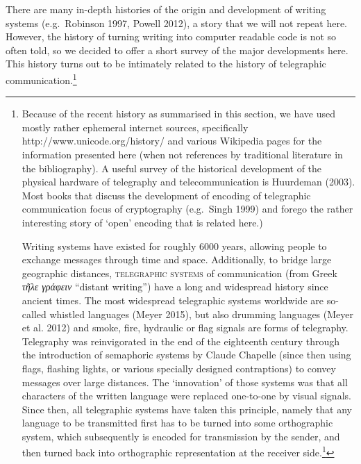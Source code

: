 There are many in-depth histories of the origin and development of writing systems (e.g.~Robinson 1997, Powell 2012), a story that we will not repeat here. However, the history of turning writing into computer readable code is not so often told, so we decided to offer a short survey of the major developments here. This history turns out to be intimately related to the history of telegraphic communication.\footnote{Because of the recent history as summarised in this section, we have used mostly rather ephemeral internet sources, specifically http://www.unicode.org/history/ and various Wikipedia pages for the information presented here (when not references by traditional literature in the bibliography). A useful survey of the historical development of the physical hardware of telegraphy and telecommunication is Huurdeman (2003). Most books that discuss the development of encoding of telegraphic communication focus of cryptography (e.g.~Singh 1999) and forego the rather interesting story of `open' encoding that is related here.)

Writing systems have existed for roughly 6000 years, allowing people to exchange messages through time and space. Additionally, to bridge large geographic distances, \textsc{telegraphic systems} of communication (from Greek \emph{τῆλε γράφειν} ``distant writing'') have a long and widespread history since ancient times. The most widespread telegraphic systems worldwide are so-called whistled languages (Meyer 2015), but also drumming languages (Meyer et al. 2012) and smoke, fire, hydraulic or flag signals are forms of telegraphy. Telegraphy was reinvigorated in the end of the eighteenth century through the introduction of semaphoric systems by Claude Chapelle (since then using flags, flashing lights, or various specially designed contraptions) to convey messages over large distances. The `innovation' of those systems was that all characters of the written language were replaced one-to-one by visual signals. Since then, all telegraphic systems have taken this principle, namely that any language to be transmitted first has to be turned into some orthographic system, which subsequently is encoded for transmission by the sender, and then turned back into orthographic representation at the receiver side.\footnote{Sound and video-based telecommunication of course takes a different approach by ignoring the written version of language and directly encode sound waves or light patterns.) This of course implies that the usefulness of any such telegraphic encoding completely depends on the often rather haphazard structure of orthographic systems.

}}
